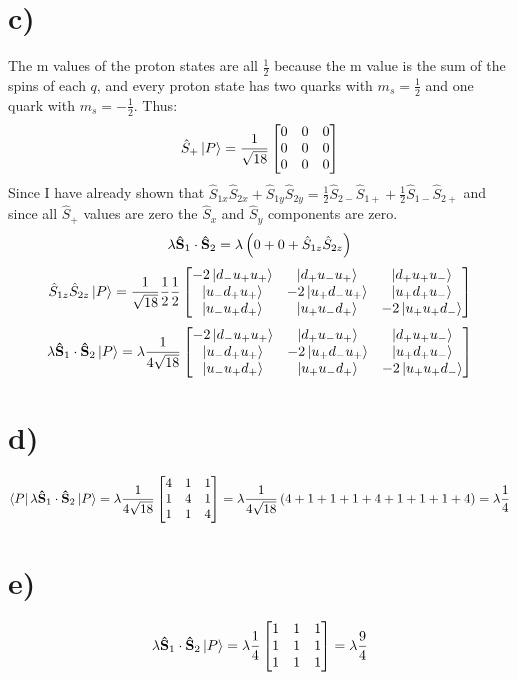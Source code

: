 \documentclass[english]{article}
\begin{document}
\section*{c)}
The m values of the proton states are all $\frac{1}{2}$ because the m value is the sum of the spins of each $q$, and every proton state has two quarks with $m_s=\frac{1}{2}$ and one quark with $m_s=-\frac{1}{2}$. Thus:
\[
\hat{S}_+\ket{P}=\frac{1}{\sqrt{18}}
\begin{bmatrix}
0 & 0 & 0\\
0 & 0 & 0\\
0 & 0 & 0
\end{bmatrix}
\]
Since I have already shown that $\hat{S}_{1x}\hat{S}_{2x}+\hat{S}_{1y}\hat{S}_{2y}=\frac{1}{2}\hat{S}_{2-}\hat{S}_{1+}+\frac{1}{2}\hat{S}_{1-}\hat{S}_{2+}$ and since all $\hat{S}_+$ values are zero the $\hat{S}_x$ and $\hat{S}_y$ components are zero.
$$\lambda\vb{\hat{S}}_1\cdot\vb{\hat{S}}_2=\lambda\left(0+0+\hat{S}_{1z}\hat{S}_{2z}\right)$$
\[
\hat{S}_{1z}\hat{S}_{2z}\ket{P}=\frac{1}{\sqrt{18}}\frac{1}{2}\frac{1}{2}
\begin{bmatrix}
-2\ket{d_-u_+u_+} & \ket{d_+u_-u_+} & \ket{d_+u_+u_-}\\
\ket{u_-d_+u_+} & -2\ket{u_+d_-u_+} & \ket{u_+d_+u_-}\\
\ket{u_-u_+d_+} & \ket{u_+u_-d_+} & -2\ket{u_+u_+d_-}
\end{bmatrix}
\]
\[
\lambda\vb{\hat{S}}_1\cdot\vb{\hat{S}}_2\ket{P}=\lambda\frac{1}{4\sqrt{18}}
\begin{bmatrix}
-2\ket{d_-u_+u_+} & \ket{d_+u_-u_+} & \ket{d_+u_+u_-}\\
\ket{u_-d_+u_+} & -2\ket{u_+d_-u_+} & \ket{u_+d_+u_-}\\
\ket{u_-u_+d_+} & \ket{u_+u_-d_+} & -2\ket{u_+u_+d_-}
\end{bmatrix}
\]
\section*{d)}
\[
\bra{P}\lambda\vb{\hat{S}}_1\cdot\vb{\hat{S}}_2\ket{P}=\lambda\frac{1}{4\sqrt{18}}
\begin{bmatrix}
4 & 1 & 1\\
1 & 4 & 1\\
1 & 1 & 4
\end{bmatrix}
=\lambda\frac{1}{4\sqrt{18}}\left(4+1+1+1+4+1+1+1+4\right)=\lambda\frac{1}{4}
\]
\section*{e)}
\[
\lambda\vb{\hat{S}}_1\cdot\vb{\hat{S}}_2\ket{P}=\lambda\frac{1}{4}
\begin{bmatrix}
1 & 1 & 1\\
1 & 1 & 1\\
1 & 1 & 1
\end{bmatrix}
=\lambda\frac{9}{4}
\]
\end{document}
